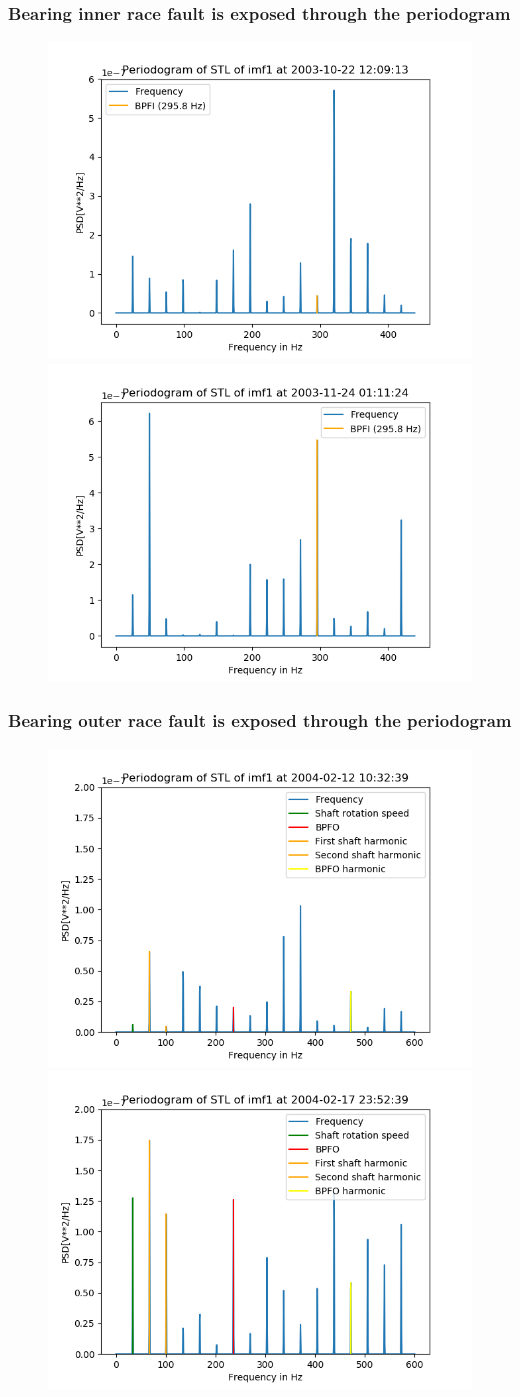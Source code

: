 \documentclass{beamer}
\begin{document}



\begin{frame}
	\frametitle{Bearing inner race fault is exposed through the periodogram }
	\begin{figure}[H]
		\centering
		\includegraphics[width=0.45\linewidth]{start_imf1_bpfi}
		\includegraphics[width=0.45\linewidth]{end_imf1_bpfi}
	\end{figure}
\end{frame}



\begin{frame}
	\frametitle{Bearing outer race fault is exposed through the periodogram }
	\begin{figure}[H]
		\centering
		\includegraphics[width=0.45\linewidth]{start_imf1_bpfo}
		\includegraphics[width=0.45\linewidth]{end_imf1_bpfo}
	\end{figure}
\end{frame}
\end{document}
